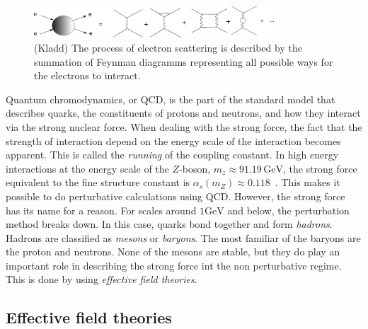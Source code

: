 \begin{figure}
    \centering
    \includegraphics[width=0.8\textwidth]{figurer/electron_scattering.pdf}
    \caption{(Kladd) The process of electron scattering is described by the summation of Feynman diagramms representing all possible ways for the electrons to interact. }
    \label{fig:qed feynman diagrams}
\end{figure}

Quantum chromodynamics, or QCD, is the part of the standard model that describes quarks, the constituents of protons and neutrons, and how they interact via the strong nuclear force.
When dealing with the strong force, the fact that the strength of interaction depend on the energy scale of the interaction becomes apparent.
This is called the \emph{running} of the coupling constant.
In high energy interactions at the energy scale of the $Z$-boson, $m_z \approx 91.19 \, \text{GeV}$, the strong force equivalent to the fine structure constant is $\alpha_s(m_Z) \approx 0.118$~\cite{PDG}. 
This makes it possible to do perturbative calculations using QCD.
However, the strong force has its name for a reason.
For scales around $1 \text{GeV}$ and below, the perturbation method breaks down.
In this case, quarks bond together and form \emph{hadrons}.
Hadrons are classified as \emph{mesons} or \emph{baryons}.
The most familiar of the baryons are the proton and neutrons.
None of the mesons are stable, but they do play an important role in describing the strong force int the non perturbative regime.
This is done by using \emph{effective field theories}.

\subsection*{Effective field theories}

